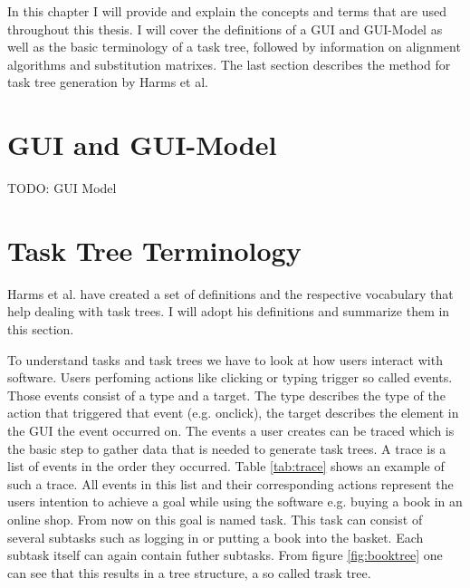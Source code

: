 In this chapter I will provide and explain the concepts and terms that are used throughout this thesis. 
I will cover the definitions of a GUI and GUI-Model as well as the basic terminology of a task tree, followed by 
 information on alignment algorithms and substitution matrixes.
The last section describes the method for task tree generation by Harms et al.\cite{harms2013}


\section{GUI and GUI-Model}
\label{sec:foundationguiandguimodel}

TODO: GUI Model

\section{Task Tree Terminology}
\label{sec:foundationtasktreeterminology}
Harms et al.\cite{harms2013} have created a set of definitions and the respective vocabulary that help dealing with task trees.
I will adopt his definitions and summarize them in this section.

To understand tasks and task trees we have to look at how users interact with software. 
Users perfoming actions like clicking or typing trigger so called events. Those events consist of a type and a target. 
The type describes the type of the action that triggered that event (e.g. onclick), the target describes the element in the GUI the event occurred on.
The events a user creates can be traced which is the basic step to gather data that is needed to generate task trees. 
A trace is a list of events in the order they occurred. Table \ref{tab:trace} shows an example of such a trace. 
All events in this list and their corresponding actions represent the users intention to achieve a goal while using the software e.g. buying a book 
in an online shop. From now on this goal is named task. This task can consist of several subtasks such as logging in or putting a book into the basket.
Each subtask itself can again contain futher subtasks. From figure \ref{fig:booktree} one can see that this results in a tree structure, a so called trask tree.

